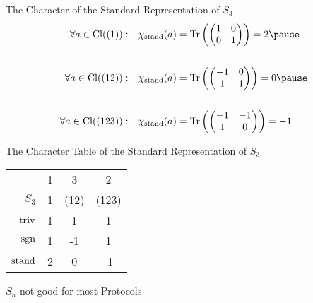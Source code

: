 \begin{frame}{The Character of the Standard Representation of $S_3$}
    \large
   \begin{align*}
    \forall a \in \Cl((1)): \quad & \chi_{\stand}(a) = \Tr\left(
        \begin{pmatrix}
            1 & 0 \\
            0 & 1
        \end{pmatrix}
    \right) = 2 \pause \\\\
    \forall a \in \Cl((12)): \quad & \chi_{\stand}(a) = \Tr\left(
        \begin{pmatrix}
            -1 & 0 \\
            1 & 1
        \end{pmatrix}
    \right) = 0 \pause \\\\
    \forall a \in \Cl((123)): \quad & \chi_{\stand}(a) = \Tr\left(
        \begin{pmatrix}
            -1 & -1 \\
            1 & 0
        \end{pmatrix}
    \right) = -1
   \end{align*} 
\end{frame}

\begin{frame}{The Character Table of the Standard Representation of $S_3$}
    \large
    \centering
    \begin{tabular}{r | c  c  c}
                    & 1 & 3     & 2     \\
        $S_3$       & 1 & (12)  & (123) \\ \hline \pause
        $\operatorname{triv}$     & 1 & 1     & 1     \\ \pause
        $\operatorname{sgn}$      & 1 & -1    & 1     \\ \pause
        $\operatorname{stand}$    & 2 & 0     & -1
    \end{tabular}

\end{frame}

\begin{frame}{$S_n$ not good for most Protocols}
\end{frame}
